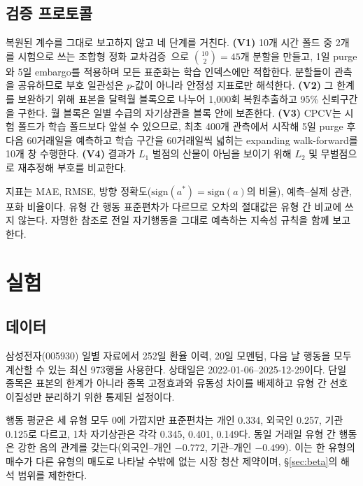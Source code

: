 \subsection{검증 프로토콜}
\label{sec:protocol}

복원된 계수를 그대로 보고하지 않고 네 단계를 거친다. \textbf{(V1)} 10개 시간 폴드
중 2개를 시험으로 쓰는 조합형 정화 교차검증~\cite{lopez2018advances}으로
$\binom{10}{2}=45$개 분할을 만들고, 1일 purge와 5일 embargo를 적용하며 모든
표준화는 학습 인덱스에만 적합한다. 분할들이 관측을 공유하므로 부호 일관성은
$p$-값이 아니라 안정성 지표로만 해석한다. \textbf{(V2)} 그 한계를 보완하기 위해
표본을 달력월 블록으로 나누어 1{,}000회 복원추출하고 95\% 신뢰구간을 구한다. 월
블록은 일별 수급의 자기상관을 블록 안에 보존한다. \textbf{(V3)} CPCV는 시험 폴드가
학습 폴드보다 앞설 수 있으므로, 최초 400개 관측에서 시작해 5일 purge 후 다음
60거래일을 예측하고 학습 구간을 60거래일씩 넓히는 expanding walk-forward를 10개 창
수행한다. \textbf{(V4)} 결과가 $L_1$ 벌점의 산물이 아님을 보이기 위해 $L_2$ 및
무벌점으로 재추정해 부호를 비교한다.

지표는 MAE, RMSE, 방향 정확도($\mathrm{sign}(a^{*})=\mathrm{sign}(a)$의 비율),
예측--실제 상관, 포화 비율이다. 유형 간 행동 표준편차가 다르므로 오차의 절대값은
유형 간 비교에 쓰지 않는다. 자명한 참조로 전일 자기행동을 그대로 예측하는 지속성
규칙을 함께 보고한다.

\section{실험}
\label{sec:experiments}

\subsection{데이터}
\label{sec:data}

삼성전자(005930) 일별 자료에서 252일 환율 이력, 20일 모멘텀, 다음 날 행동을 모두
계산할 수 있는 최신 973행을 사용한다. 상태일은 2022-01-06--2025-12-29이다. 단일
종목은 표본의 한계가 아니라 종목 고정효과와 유동성 차이를 배제하고 유형 간 선호
이질성만 분리하기 위한 통제된 설정이다.

행동 평균은 세 유형 모두 0에 가깝지만 표준편차는 개인 0.334, 외국인 0.257, 기관
0.125로 다르고, 1차 자기상관은 각각 0.345, 0.401, 0.149다. 동일 거래일 유형 간
행동은 강한 음의 관계를 갖는다(외국인--개인 $-0.772$, 기관--개인 $-0.499$). 이는 한
유형의 매수가 다른 유형의 매도로 나타날 수밖에 없는 시장 청산 제약이며,
\S\ref{sec:beta}의 해석 범위를 제한한다.

